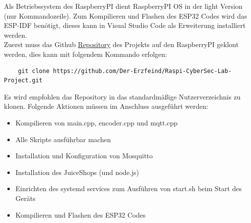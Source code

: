 \documentclass[a4paper,12pt]{article}
\begin{document}
Als Betriebssystem des RaspberryPI dient RaspberryPI OS in der light Version (nur Kommandozeile).
Zum Kompilieren und Flashen des ESP32 Codes wird das ESP-IDF benötigt, dieses kann in Visual Studio Code als Erweiterung installiert werden.\\

 Zuerst muss das Github \href{https://github.com/Der-Erzfeind/Raspi-CyberSec-Lab-Project.git}{Repository} des Projekts auf den RaspberryPI geklont werden, dies kann mit folgendem Kommando erfolgen:
 \begin{verbatim}
    git clone https://github.com/Der-Erzfeind/Raspi-CyberSec-Lab-Project.git
 \end{verbatim}
Es wird empfohlen das Repository in das standardmäßige Nutzerverzeichnis zu klonen.
Folgende Aktionen müssen im Anschluss ausgeführt werden:

\begin{itemize}
    \item Kompilieren von main.cpp, encoder.cpp und mqtt.cpp
    \item Alle Skripte ausführbar machen
    \item Installation und Konfiguration von Mosquitto
    \item Installation des JuiceShops (und node.js)
    \item Einrichten des systemd services zum Ausführen von start.sh beim Start des Geräts
    \item Kompilieren und Flashen des ESP32 Codes
\end{itemize}
\end{document}
